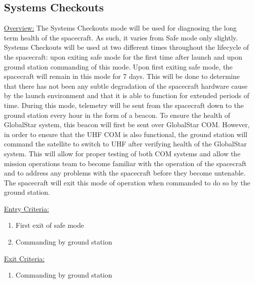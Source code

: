 \documentclass{article}
\begin{document}
\newpage

\subsection{Systems Checkouts}

\underline{Overview:} The Systems Checkouts mode will be used for diagnosing the long term health of the spacecraft. As such, it varies from Safe mode only slightly. Systems Checkouts will be used at two different times throughout the lifecycle of the spacecraft: upon exiting safe mode for the first time after launch and upon ground station commanding of this mode. Upon first exiting safe mode, the spacecraft will remain in this mode for 7 days. This will be done to determine that there has not been any subtle degradation of the spacecraft hardware cause by the launch environment and that it is able to function for extended periods of time. During this mode, telemetry will be sent from the spacecraft down to the ground station every hour in the form of a beacon. To ensure the health of GlobalStar system, this beacon will first be sent over GlobalStar COM. However, in order to ensure that the UHF COM is also functional, the ground station will command the satellite to switch to UHF after verifying health of the GlobalStar system. This will allow for proper testing of both COM systems and allow the mission operations team to become familiar with the operation of the spacecraft and to address any problems with the spacecraft before they become untenable. The spacecraft will exit this mode of operation when commanded to do so by the ground station.

\underline{Entry Criteria:} 

\begin{enumerate}
\item First exit of safe mode
\item Commanding by ground station
\end{enumerate}

\underline{Exit Criteria:}

\begin{enumerate}
\item Commanding by ground station
\end{enumerate}
\end{document}
